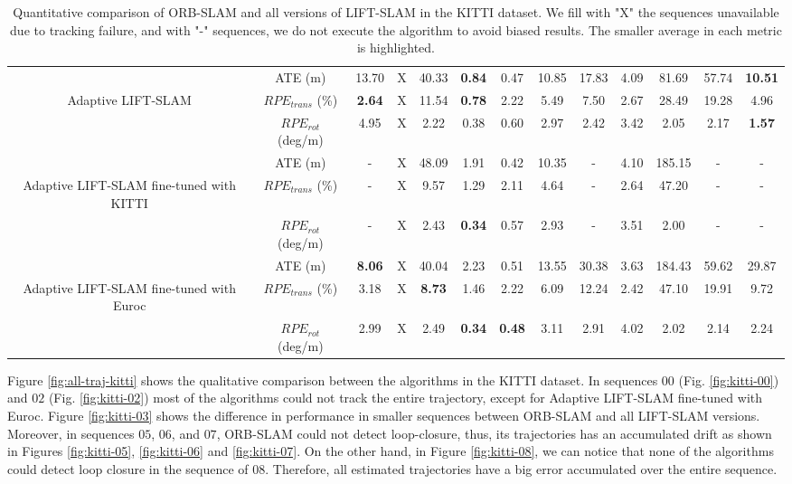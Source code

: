 \begin{table}[!h]
{\begin{tabular}{|c|c|ccccccccccc|}
          & ATE (m)                     & 13.70 & X & 40.33 & \textbf{0.84} & 0.47 & 10.85 & 17.83 & 4.09 & 81.69 & 57.74 & \textbf{10.51} \\
Adaptive LIFT-SLAM & $RPE_{trans}$ (\%) & \textbf{2.64} & X & 11.54         & \textbf{0.78} & 2.22 & 5.49 & 7.50 & 2.67 & 28.49 & 19.28 & 4.96 \\
          & $RPE_{rot}$ (deg/m)         & 4.95 & X & 2.22 & 0.38 & 0.60 & 2.97 & 2.42 & 3.42 & 2.05 & 2.17 & \textbf{1.57} \\  \hline


                                & ATE (m)                    & - & X & 48.09 & 1.91 & 0.42 & 10.35 & - & 4.10 & 185.15 & - & -  \\
Adaptive LIFT-SLAM fine-tuned with KITTI & $RPE_{trans}$ (\%) & - & X & 9.57 & 1.29        & 2.11 & 4.64 & - & 2.64 & 47.20 & - & - \\
                               & $RPE_{rot}$ (deg/m)         & - & X & 2.43 &\textbf{0.34}& 0.57 & 2.93 & - & 3.51 & 2.00 & - & -  \\  \hline


                                        & ATE (m) & \textbf{8.06} & X & 40.04 & 2.23 & 0.51 & 13.55 & 30.38 & 3.63 & 184.43 & 59.62 & 29.87 \\
Adaptive LIFT-SLAM fine-tuned with Euroc & $RPE_{trans}$ (\%) & 3.18 & X & \textbf{8.73} & 1.46 & 2.22 & 6.09 & 12.24 & 2.42 & 47.10 & 19.91 & 9.72 \\
                                        & $RPE_{rot}$ (deg/m) & 2.99 & X & 2.49 & \textbf{0.34} & \textbf{0.48} & 3.11 & 2.91 & 4.02 & 2.02 & 2.14 & 2.24  \\  \hline
\end{tabular}}

\caption{Quantitative comparison of ORB-SLAM and all versions of LIFT-SLAM in the KITTI dataset. We fill with "X" the sequences unavailable due to tracking failure, and with "-" sequences, we do not execute the algorithm to avoid biased results. The smaller average in each metric is highlighted.}
\label{tab:all-results-kitti}
\end{table}

Figure \ref{fig:all-traj-kitti} shows the qualitative comparison between the algorithms in the KITTI dataset. In sequences $00$ (Fig. \ref{fig:kitti-00}) and $02$ (Fig. \ref{fig:kitti-02}) most of the algorithms could not track the entire trajectory, except for Adaptive LIFT-SLAM fine-tuned with Euroc. Figure \ref{fig:kitti-03} shows the difference in performance in smaller sequences between ORB-SLAM and all LIFT-SLAM versions. Moreover, in sequences $05$, $06$, and $07$, ORB-SLAM could not detect loop-closure, thus, its trajectories has an accumulated drift as shown in Figures \ref{fig:kitti-05}, \ref{fig:kitti-06} and \ref{fig:kitti-07}. On the other hand, in Figure \ref{fig:kitti-08}, we can notice that none of the algorithms could detect loop closure in the sequence of $08$. Therefore, all estimated trajectories have a big error accumulated over the entire sequence.

